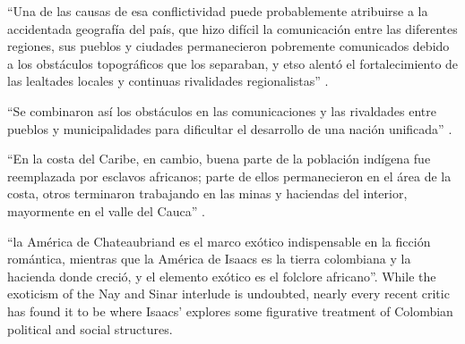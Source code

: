 \enquote{Una de las causas de esa conflictividad puede probablemente atribuirse a la accidentada geografía del país, que hizo difícil la comunicación entre las diferentes regiones, sus pueblos y ciudades permanecieron pobremente comunicados debido a los obstáculos topográficos que los separaban, y etso alentó el fortalecimiento de las lealtades locales y continuas rivalidades regionalistas} \cite[332]{Fox2011}.

\enquote{Se combinaron así los obstáculos en las comunicaciones y las rivaldades entre pueblos y municipalidades para dificultar el desarrollo de una nación unificada} \cite[333]{Fox2011}.

\enquote{En la costa del Caribe, en cambio, buena parte de la población indígena fue reemplazada por esclavos africanos; parte de ellos permanecieron en el área de la costa, otros terminaron trabajando en las minas y haciendas del interior, mayormente en el valle del Cauca} \cite[333]{Fox2011}.

\enquote{la América de Chateaubriand es el marco exótico indispensable en la ficción romántica, mientras que la América de Isaacs es la tierra colombiana y la hacienda donde creció, y el elemento exótico es el folclore africano}. While the exoticism of the Nay and Sinar interlude is undoubted, nearly every recent critic has found it to be where Isaacs' explores some figurative treatment of Colombian political and social structures. 

